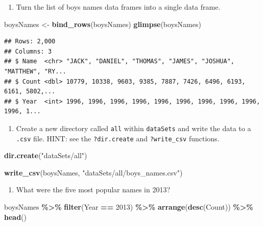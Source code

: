 \documentclass[
]{book}
\newenvironment{Shaded}{\begin{snugshade}}{\end{snugshade}}
\newcommand{\DecValTok}[1]{\textcolor[rgb]{0.00,0.00,0.81}{#1}}
\newcommand{\KeywordTok}[1]{\textcolor[rgb]{0.13,0.29,0.53}{\textbf{#1}}}
\newcommand{\NormalTok}[1]{#1}
\newcommand{\OperatorTok}[1]{\textcolor[rgb]{0.81,0.36,0.00}{\textbf{#1}}}
\newcommand{\StringTok}[1]{\textcolor[rgb]{0.31,0.60,0.02}{#1}}
\providecommand{\tightlist}{%
  \setlength{\itemsep}{0pt}\setlength{\parskip}{0pt}}
\begin{document}
\begin{alert}

\begin{enumerate}
\def\labelenumi{\arabic{enumi}.}
\tightlist
\item
  Turn the list of boys names data frames into a single data frame.
\end{enumerate}

\begin{Shaded}
\begin{Highlighting}[]
\NormalTok{boysNames \textless{}{-}}\StringTok{ }\KeywordTok{bind\_rows}\NormalTok{(boysNames)}
\KeywordTok{glimpse}\NormalTok{(boysNames)}
\end{Highlighting}
\end{Shaded}

\begin{verbatim}
## Rows: 2,000
## Columns: 3
## $ Name  <chr> "JACK", "DANIEL", "THOMAS", "JAMES", "JOSHUA", "MATTHEW", "RY...
## $ Count <dbl> 10779, 10338, 9603, 9385, 7887, 7426, 6496, 6193, 6161, 5802,...
## $ Year  <int> 1996, 1996, 1996, 1996, 1996, 1996, 1996, 1996, 1996, 1996, 1...
\end{verbatim}

\begin{enumerate}
\def\labelenumi{\arabic{enumi}.}
\setcounter{enumi}{1}
\tightlist
\item
  Create a new directory called \texttt{all} within \texttt{dataSets} and write the data to a \texttt{.csv} file. HINT: see the \texttt{?dir.create} and \texttt{?write\_csv} functions.
\end{enumerate}

\begin{Shaded}
\begin{Highlighting}[]
\KeywordTok{dir.create}\NormalTok{(}\StringTok{"dataSets/all"}\NormalTok{)}

\KeywordTok{write\_csv}\NormalTok{(boysNames, }\StringTok{"dataSets/all/boys\_names.csv"}\NormalTok{)}
\end{Highlighting}
\end{Shaded}

\begin{enumerate}
\def\labelenumi{\arabic{enumi}.}
\setcounter{enumi}{2}
\tightlist
\item
  What were the five most popular names in 2013?
\end{enumerate}

\begin{Shaded}
\begin{Highlighting}[]
\NormalTok{boysNames }\OperatorTok{\%\textgreater{}\%}\StringTok{ }
\StringTok{  }\KeywordTok{filter}\NormalTok{(Year }\OperatorTok{==}\StringTok{ }\DecValTok{2013}\NormalTok{) }\OperatorTok{\%\textgreater{}\%}
\StringTok{  }\KeywordTok{arrange}\NormalTok{(}\KeywordTok{desc}\NormalTok{(Count)) }\OperatorTok{\%\textgreater{}\%}
\StringTok{  }\KeywordTok{head}\NormalTok{()}
\end{Highlighting}
\end{Shaded}


\end{alert}
\end{document}
